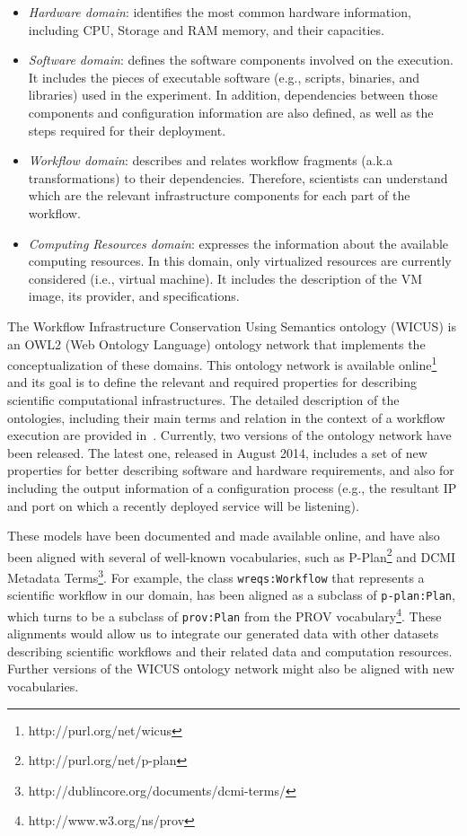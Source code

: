 \begin{itemize}
	\setlength{\itemsep}{1pt}
	\setlength{\parskip}{0pt}
	\setlength{\parsep}{0pt}

	\item{\emph{Hardware domain}}: identifies the most common hardware information, 
		including CPU, Storage and RAM memory, and their capacities.
	
	\item{\emph{Software domain}}: defines the software components involved on the execution. 
    		It includes the pieces of executable software (e.g., scripts, binaries, and libraries) used in 
		the experiment. In addition, dependencies between those components and configuration 
		information are also defined, as well as the steps required for their deployment.

	\item{\emph{Workflow domain}}: describes and relates workflow fragments (a.k.a transformations) 
    		to their dependencies. Therefore, scientists can understand which are the relevant infrastructure 
		components for each part of the workflow.
	
	\item{\emph{Computing Resources domain}}: expresses the information about the available 
    		computing resources. In this domain, only virtualized resources are currently considered 
		(i.e., virtual machine). It includes the description of the VM image, its provider, and specifications.
\end{itemize}


The Workflow Infrastructure Conservation Using Semantics ontology 
(WICUS) is an OWL2 (Web Ontology Language) ontology network that 
implements the conceptualization of these domains. This ontology 
network is available online\footnote{http://purl.org/net/wicus} and its goal 
is to define the relevant and required properties for describing scientific 
computational infrastructures. The detailed description of the ontologies, 
including their main terms and relation in the context of a workflow execution 
are provided in~\cite{wicus}. Currently, two versions of the ontology network 
have been released. The latest one, released in August 2014,  includes a set 
of new properties for better describing software and hardware requirements, 
and also for including the output information of a configuration process (e.g., 
the resultant IP and port on which a recently deployed service will be listening).


These models have been documented and made available online, and have also
been aligned with several of well-known vocabularies, such as 
P-Plan\footnote{http://purl.org/net/p-plan} and DCMI Metadata 
Terms\footnote{http://dublincore.org/documents/dcmi-terms/}. For example, the 
class \texttt{wreqs:Workflow} that represents a scientific workflow in our domain, 
has been aligned as a subclass of \texttt{p-plan:Plan}, which turns to be a subclass 
of \texttt{prov:Plan} from the PROV vocabulary\footnote{http://www.w3.org/ns/prov}. 
These alignments would allow us to integrate our generated data with other datasets
describing scientific workflows and their related data and computation resources.
Further versions of the WICUS ontology network might also be aligned with 
new vocabularies.  

